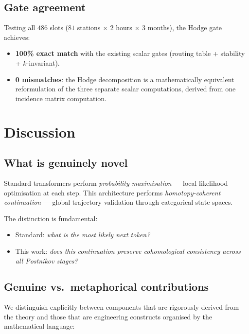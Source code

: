\documentclass[11pt,a4paper]{article}
\begin{document}
\subsection{Gate agreement}

Testing all $486$ slots ($81$ stations $\times$ $2$ hours $\times$
$3$ months), the Hodge gate achieves:
\begin{itemize}
  \item \textbf{100\% exact match} with the existing scalar gates
        (routing table + stability + $k$-invariant).
  \item \textbf{0 mismatches}: the Hodge decomposition is a
        mathematically equivalent reformulation of the three
        separate scalar computations, derived from one incidence
        matrix computation.
\end{itemize}

\section{Discussion}

\subsection{What is genuinely novel}

Standard transformers perform \emph{probability maximisation} ---
local likelihood optimisation at each step. This architecture
performs \emph{homotopy-coherent continuation} --- global
trajectory validation through categorical state spaces.

The distinction is fundamental:
\begin{itemize}
  \item Standard: \emph{what is the most likely next token?}
  \item This work: \emph{does this continuation preserve
        cohomological consistency across all Postnikov stages?}
\end{itemize}

\subsection{Genuine vs.\ metaphorical contributions}

We distinguish explicitly between components that are
rigorously derived from the theory and those that are
engineering constructs organised by the mathematical language:
\end{document}
